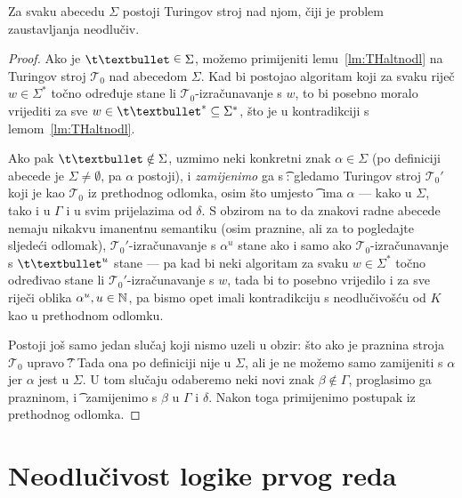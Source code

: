 \begin{propozicija}
Za svaku abecedu $\Sigma$ postoji Turingov stroj nad njom, čiji je problem zaustavljanja neodlučiv\!.
\end{propozicija}
\begin{proof}
Ako je $\t\textbullet\;\raisebox{1.1pt}{$\in$}\;\Sigma$, možemo primijeniti lemu~\ref{lm:THaltnodl} na Turingov stroj $\mathcal T_0$ nad abecedom $\Sigma$. Kad bi postojao algoritam koji za svaku riječ $w\in\Sigma^*$ točno određuje stane li $\mathcal T_0$-izračunavanje s $w$, to bi posebno moralo vrijediti za sve $w\in\t\textbullet^*\subseteq\Sigma^*$, što je u kontradikciji s lemom~\ref{lm:THaltnodl}.

Ako pak $\t\textbullet\notin\Sigma$, uzmimo neki konkretni znak $\alpha\in\Sigma$ (po definiciji abecede je $\Sigma\ne\emptyset$, pa $\alpha$ postoji), i \emph{zamijenimo} ga s \t\textbullet: gledamo Turingov stroj $\mathcal T_0'$ koji je kao $\mathcal T_0$ iz prethodnog odlomka, osim što umjesto \t\textbullet\ ima $\alpha$ --- kako u $\Sigma$, tako i u $\Gamma$ i u svim prijelazima od $\delta$. S obzirom na to da znakovi radne abecede nemaju nikakvu imanentnu semantiku (osim praznine, ali za to pogledajte sljedeći odlomak), $\mathcal T_0'$-izračunavanje s $\alpha^u$ stane ako i samo ako $\mathcal T_0$-izračunavanje s $\t\textbullet^u$ stane --- pa kad bi neki algoritam za svaku $w\in\Sigma^*$ točno određivao stane li $\mathcal T_0'$-izračunavanje s $w$, tada bi to posebno vrijedilo i za sve riječi oblika $\alpha^u,u\in{\mathbb N}$, pa bismo opet imali kontradikciju s neodlučivošću od $K$ kao u prethodnom odlomku.

Postoji još samo jedan slučaj koji nismo uzeli u obzir: što ako je praznina stroja $\mathcal T_0$ upravo~\t\textbullet? Tada ona po definiciji nije u $\Sigma$, ali je ne možemo samo zamijeniti s $\alpha$ jer $\alpha$ jest u $\Sigma$. U tom slučaju odaberemo neki novi znak $\beta\notin\Gamma$, proglasimo ga prazninom, i \t\textbullet\ zamijenimo s $\beta$ u $\Gamma$ i $\delta$. Nakon toga primijenimo postupak iz prethodnog odlomka.
\end{proof}

\section{Neodlučivost logike prvog reda}

